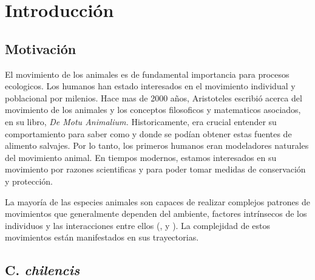 \chapter{Introducción}

\section{Motivación}
El movimiento de los animales es de fundamental importancia para procesos ecologicos. Los humanos han estado interesados en el movimiento individual y poblacional por milenios. Hace mas de 2000 años, Aristoteles escribió acerca del movimiento de los animales y los conceptos filosoficos y matematicos asociados, en su libro, \textit{De Motu Animalium.} Historicamente, era crucial entender su comportamiento para saber como y donde se podían obtener estas fuentes de alimento salvajes. Por lo tanto, los primeros humanos eran modeladores naturales del movimiento animal.  En tiempos modernos, estamos interesados en su movimiento por razones scientificas y para poder tomar medidas de conservación y protección. 

  

La mayoría de las especies animales son capaces de realizar complejos patrones de movimientos que generalmente dependen del ambiente, factores intrínsecos de los individuos y las interacciones entre ellos (\cite{morales2005adaptive}, \cite{morales2010building} y \cite{nathan2008emerging}). La complejidad de estos movimientos están manifestados en sus trayectorias. %



\section{ C. \textit{chilencis} }
\label{C chilencis}

